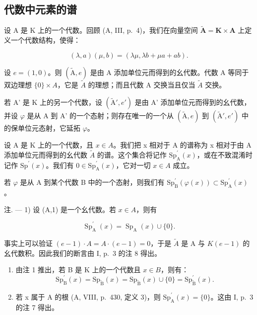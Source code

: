 \subsection{代数中元素的谱}

设 A 是 K 上的一个代数。回顾 (A, III, p.~4)，我们在向量空间 \(\widetilde{\mathbf{A}} = \mathbf{K} \times \mathbf{A}\) 上定义一个代数结构，使得：

\[
(\lambda , a) (\mu , b) = (\lambda \mu , \lambda b + \mu a + a b).
\]

设 \(e = (1, 0)\)。则 \((\tilde{\mathrm{A}}, e)\) 是由 A 添加单位元而得到的幺代数。代数 A 等同于双边理想 \(\{0\} \times A\)，它是 \(\tilde{A}\) 的理想；而且代数 A 交换当且仅当 \(\tilde{A}\) 交换。

若 A' 是 K 上的另一个代数，设 \((\tilde{\mathrm{A}}', e')\) 是由 A' 添加单位元而得到的幺代数，并设 \(\varphi\) 是从 A 到 A' 的一个态射；则存在唯一的一个从 \((\tilde{\mathrm{A}}, e)\) 到 \((\tilde{\mathrm{A}}', e')\) 中的保单位元态射，它延拓 \(\varphi\)。

设 A 是 K 上的一个代数，且 \(x \in A\)。我们把 x 相对于 A 的谱称为 x 相对于由 A 添加单位元而得到的幺代数 \(\widetilde{A}\) 的谱。这个集合将记作 \(\mathrm{Sp}_{\mathrm{A}}^{\prime}(x)\)，或在不致混淆时记作 \(\mathrm{Sp}^{\prime}(x)\)。我们有 \(0 \in \mathrm{Sp}_{\mathrm{A}}^{\prime}(x)\)，它对一切 \(x \in A\) 成立。

若 \(\varphi\) 是从 A 到某个代数 B 中的一个态射，则我们有 \(\mathrm{Sp}_{\mathrm{B}}^{\prime}(\varphi(x)) \subset \mathrm{Sp}_{\mathrm{A}}^{\prime}(x)\)。

注. --- 1) 设 (A,1) 是一个幺代数。若 \(x \in A\)，则有

\[
\operatorname{Sp} _ {\mathrm{A}} ^ {\prime} (x) = \operatorname{Sp} _ {\mathrm{A}} (x) \cup \{0 \}.
\]

事实上可以验证 \((e-1) \cdot A = A \cdot (e-1) = 0\)，于是 \(\widetilde{A}\) 是 A 与 \(K(e-1)\) 的幺代数积。因此我们的断言由 I, p.~3 的注 8 得出。

\begin{enumerate}
\def\labelenumi{\arabic{enumi})}
\setcounter{enumi}{1}
\tightlist
\item
  由注 1 推出，若 B 是 K 上的一个代数且 \(x \in B\)，则有：
\[
\mathrm{Sp} _ {\mathrm{B}} ^ {\prime} (x) = \mathrm{Sp} _ {\widetilde {\mathrm{B}}} (x) = \mathrm{Sp} _ {\widetilde {\mathrm{B}}} (x) \cup \{0 \} = \mathrm{Sp} _ {\widetilde {\mathrm{B}}} ^ {\prime} (x).
\]

\item
  若 x 属于 A 的根 (A, VIII, p.~430, 定义 3)，则 \(\mathrm{Sp}_{\mathrm{A}}^{\prime}(x)=\{0\}\)。这由 I, p.~3 的注 7 得出。
\end{enumerate}

